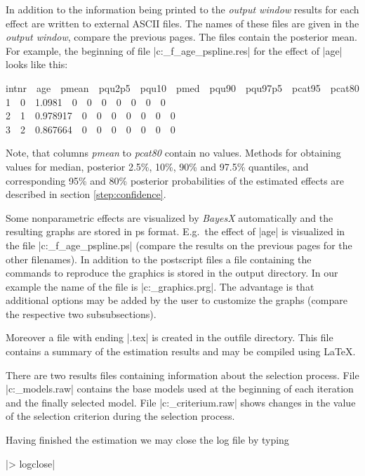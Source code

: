 In addition to the information being printed to the {\it output window} results for each effect are written to external ASCII
files. The names of these files are given in the {\it output window}, compare the previous pages. The files contain the
posterior mean. For example, the beginning of file |c:\data\s_f_age_pspline.res| for the effect of |age| looks like this:

{\footnotesize
intnr \,\, age \,\, pmean \,\, pqu2p5 \,\, pqu10 \,\, pmed \,\, pqu90 \,\, pqu97p5 \,\, pcat95 \,\, pcat80\\
1 \,\,  0 \,\,  1.0981 \,\,  0 \,\,  0 \,\,  0 \,\,  0 \,\,  0 \,\,  0 \,\,  0 \\
2 \,\,  1 \,\,  0.978917 \,\,  0 \,\,  0 \,\,  0 \,\,  0 \,\,  0 \,\,  0 \,\,  0 \\
3 \,\,  2 \,\,  0.867664 \,\,  0  \,\, 0 \,\,  0 \,\,  0 \,\,  0 \,\,  0 \,\,  0}

Note, that columns {\it pmean} to {\it pcat80} contain no values. Methods for obtaining values for median, posterior 2.5\%,
10\%, 90\% and 97.5\% quantiles, and corresponding 95\% and 80\% posterior probabilities of the estimated effects are described
in section \ref{step:confidence}.

Some nonparametric effects are visualized by {\it BayesX} automatically and the resulting graphs are stored in ps format.
E.g.~the effect of |age| is visualized in the file |c:\data\s_f_age_pspline.ps| (compare the results on the previous pages for
the other filenames). In addition to the postscript files a file containing the commands to reproduce the graphics is stored in
the output directory. In our example the name of the file is |c:\data\s_graphics.prg|. The advantage is that additional options
may be added by the user to customize the graphs (compare the respective two subsubsections).

Moreover a file with ending |.tex| is created in the outfile directory. This file contains a summary of the estimation results
and may be compiled using \LaTeX.

There are two results files containing information about the selection process. File |c:\data\s_models.raw| contains the base
models used at the beginning of each iteration and the finally selected model. File |c:\data\s_criterium.raw| shows changes in
the value of the selection criterion during the selection process.

Having finished the estimation we may close the log file by typing

|> logclose|

